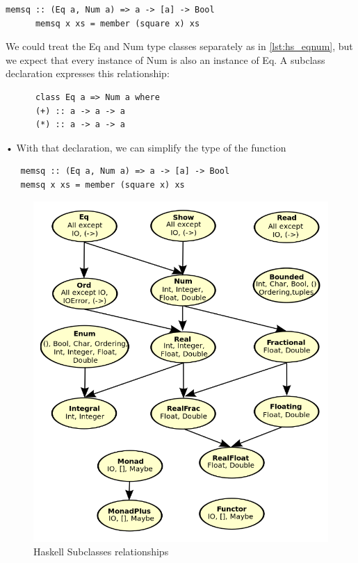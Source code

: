 \begin{paracol}{2}
   \vspace{\fill}
   \begin{lstlisting}[label={lst:hs_eqnum}]
      memsq :: (Eq a, Num a) => a -> [a] -> Bool
      memsq x xs = member (square x) xs
   \end{lstlisting}
   We could treat the Eq and Num type classes separately as in \ref{lst:hs_eqnum}, but we expect that every instance of Num is also an instance of Eq.
   A subclass declaration expresses this relationship:
   \begin{lstlisting}
      class Eq a => Num a where
      (+) :: a -> a -> a
      (*) :: a -> a -> a
   \end{lstlisting}
• With that declaration, we can simplify the type of the function

\begin{lstlisting}
   memsq :: (Eq a, Num a) => a -> [a] -> Bool
   memsq x xs = member (square x) xs
\end{lstlisting}

\vspace{\fill}
\switchcolumn

\begin{figure}[htbp]
   \centering
   \includegraphics{images/haskell_subclasses.png}
   \caption{Haskell Subclasses relationships}
   \label{fig:haskell_subclasses}
\end{figure}

\end{paracol}

